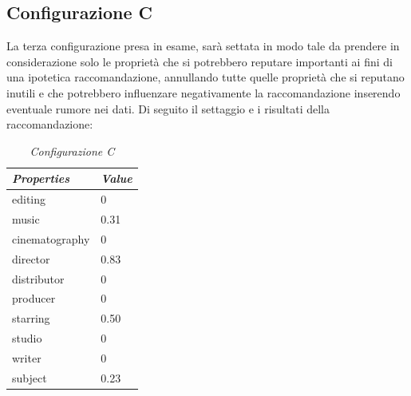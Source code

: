 \subsection{Configurazione C}
La terza configurazione presa in esame, sarà settata in modo tale da prendere in considerazione solo le proprietà che si potrebbero reputare importanti ai fini di una ipotetica raccomandazione, annullando tutte quelle proprietà che si reputano inutili e che potrebbero influenzare negativamente la raccomandazione inserendo eventuale rumore nei dati. Di seguito il settaggio e i risultati della raccomandazione:
\begin{table}[H]
	\small
	\centering
	\begin{tabular}{l l}
		\textit{Properties} & \textit{Value} \\\hline
		editing & 0 \\
		music & 0.31 \\
		cinematography & 0\\
		director & 0.83\\
		distributor & 0\\
		producer & 0 \\
		starring & 0.50\\
		studio & 0\\
		writer & 0\\
		subject & 0.23\\
	\end{tabular}
	\caption{\emph{Configurazione C}}
\end{table}


